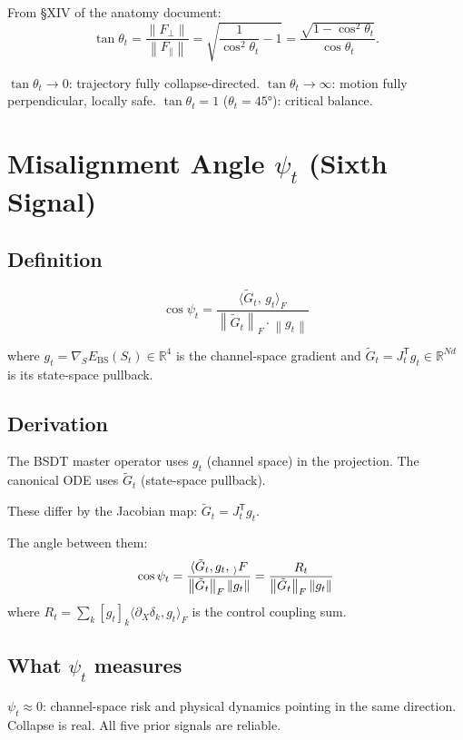 \documentclass[11pt,a4paper]{article}
\theoremstyle{definition}
\newcommand{\R}{\mathbb{R}}
\newcommand{\T}{^{\mathsf{T}}}
\newcommand{\norm}[1]{\left\|#1\right\|}
\newcommand{\inner}[2]{\langle #1,\,#2\rangle}
\begin{document}
From §XIV of the anatomy document:
\[
\tan\theta_t = \frac{\norm{F_\perp}}{\norm{F_\parallel}} = \sqrt{\frac{1}{\cos^2\theta_t} - 1} = \frac{\sqrt{1-\cos^2\theta_t}}{\cos\theta_t}.
\]

$\tan\theta_t \to 0$: trajectory fully collapse-directed.
$\tan\theta_t \to \infty$: motion fully perpendicular, locally safe.
$\tan\theta_t = 1$ ($\theta_t = 45°$): critical balance.

\section{Misalignment Angle $\psi_t$ (Sixth Signal)}

\subsection{Definition}

\begin{lockedbox}
\[
\cos\psi_t = \frac{\inner{\tilde G_t}{g_t}_F}{\norm{\tilde G_t}_F\cdot\norm{g_t}}
\]
\end{lockedbox}

where $g_t = \nabla_S E_\mathrm{BS}(S_t) \in \R^4$ is the channel-space gradient
and $\tilde G_t = J_t\T g_t \in \R^{Nd}$ is its state-space pullback.

\subsection{Derivation}

The BSDT master operator uses $g_t$ (channel space) in the projection.
The canonical ODE uses $\tilde G_t$ (state-space pullback).

These differ by the Jacobian map: $\tilde G_t = J_t\T g_t$.

The angle between them:
\[
\cos\psi_t = \frac{\inner{\tilde G_t, g_t}_F}{\norm{\tilde G_t}_F\norm{g_t}}
= \frac{R_t}{\norm{\tilde G_t}_F\norm{g_t}}
\]
where $R_t = \sum_k [g_t]_k\langle\partial_X\delta_k, g_t\rangle_F$ is the control coupling sum.

\subsection{What $\psi_t$ measures}

$\psi_t \approx 0$: channel-space risk and physical dynamics pointing in the same direction.
Collapse is real. All five prior signals are reliable.
\end{document}
